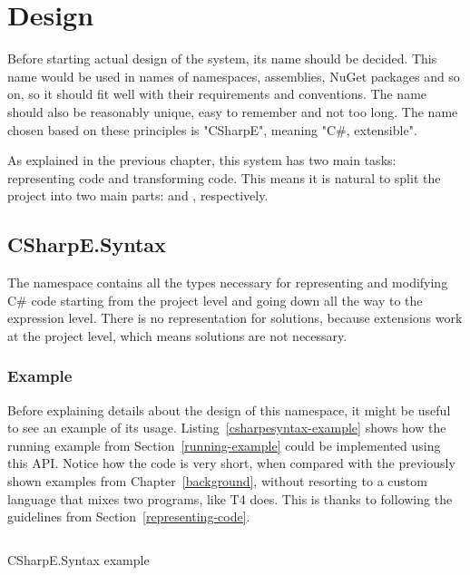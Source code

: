 \chapter{Design}

Before starting actual design of the system, its name should be decided. This name would be used in names of namespaces, assemblies, NuGet packages and so on, so it should fit well with their requirements and conventions. The name should also be reasonably unique, easy to remember and not too long. The name chosen based on these principles is "CSharpE", meaning "C\#, extensible".

As explained in the previous chapter, this system has two main tasks: representing code and transforming code. This means it is natural to split the project into two main parts:  and , respectively.

\section{CSharpE.Syntax}

The  namespace contains all the types necessary for representing and modifying C\# code starting from the project level and going down all the way to the expression level. There is no representation for solutions, because extensions work at the project level, which means solutions are not necessary.

\subsection{Example}

Before explaining details about the design of this namespace, it might be useful to see an example of its usage. Listing~\ref{csharpesyntax-example} shows how the running example from Section~\ref{running-example} could be implemented using this \ac{API}. Notice how the code is very short, when compared with the previously shown examples from Chapter~\ref{background}, without resorting to a custom language that mixes two programs, like \ac{T4} does. This is thanks to following the guidelines from Section~\ref{representing-code}.

\begin{listing}
\inputminted[firstline=15,lastline=31]{csharp}{samples/CSharpE.Syntax/Program.cs}
\caption{CSharpE.Syntax example}
\label{csharpesyntax-example}
\end{listing}

